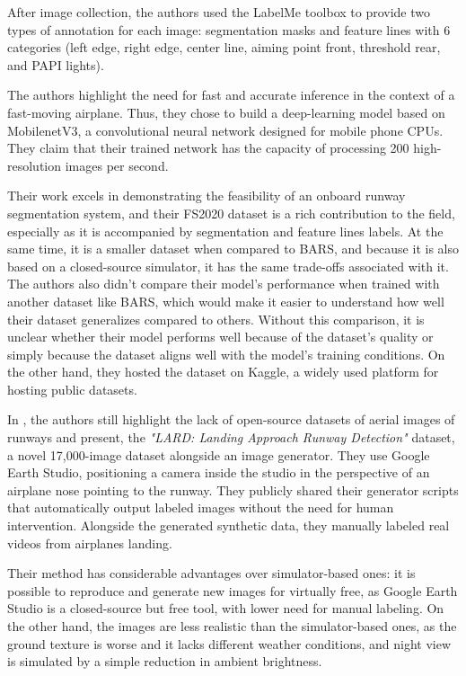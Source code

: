 After image collection, the authors used the LabelMe toolbox to provide two types of annotation for each image: segmentation masks and feature lines with 6 categories (left edge, right edge, center line, aiming point front, threshold rear, and PAPI lights).

The authors highlight the need for fast and accurate inference in the context of a fast-moving airplane. Thus, they chose to build a deep-learning model based on MobilenetV3, a convolutional neural network designed for mobile phone CPUs. They claim that their trained network has the capacity of processing 200 high-resolution images per second.

Their work excels in demonstrating the feasibility of an onboard runway
segmentation system, and their FS2020 dataset is a rich contribution to the
field, especially as it is accompanied by segmentation and feature lines labels.
At the same time, it is a smaller dataset when compared to BARS, and because it
is also based on a closed-source simulator, it has the same trade-offs
associated with it. The authors also didn't compare their model's performance when
trained with another dataset like BARS, which would make it easier to understand
how well their dataset generalizes compared to others. Without this comparison,
it is unclear whether their model performs well because of the dataset's quality
or simply because the dataset aligns well with the model's training conditions.
On the other hand, they hosted the dataset on Kaggle, a widely used platform for hosting public datasets.

In \cite{ducoffe_lard_2023}, the authors still highlight the lack of open-source datasets of aerial images of runways and present, the \emph{"LARD: Landing Approach Runway Detection"} dataset, a novel 17,000-image dataset alongside an image generator. They use Google Earth Studio, positioning a camera inside the studio in the perspective of an airplane nose pointing to the runway. They publicly shared their generator scripts that automatically output labeled images without the need for human intervention. Alongside the generated synthetic data, they manually labeled real videos from airplanes landing.

Their method has considerable advantages over simulator-based ones: it is
possible to reproduce and generate new images for virtually free, as Google
Earth Studio is a closed-source but free tool, with lower need for manual
labeling. On the other hand, the images are less realistic than the simulator-based ones, as the ground texture is worse and it lacks different weather conditions, and night view is simulated by a simple reduction in ambient brightness.

